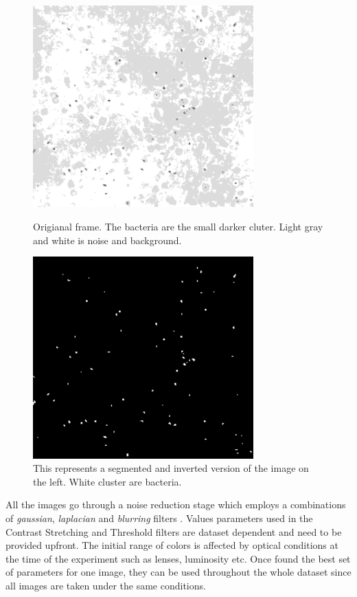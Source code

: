 \documentclass[conference]{IEEEtran}
\begin{document}
\begin{figure}

    \begin{minipage}[l]{1.0\columnwidth}
        \centering
        \includegraphics[width=8.5cm]{./images/bacteriasmall}
        \caption{Origianal frame. The bacteria are the small darker cluter. Light gray and white is noise and background.}\label{contrast}
    \end{minipage}
    \hfill{}
    \begin{minipage}[r]{1.0\columnwidth}
        \centering
        \includegraphics[width=8.5cm]{./images/bacteriasmall_threshold}
        \caption{This represents a segmented and inverted version of the image on the left. White cluster are bacteria.}\label{BBB}
    \end{minipage}
\end{figure}

 
All the images go through a noise reduction stage which employs a combinations of \textit{gaussian}, \textit{laplacian} and \textit{blurring} filters \cite{Deng:1993}.
Values parameters used in the Contrast Stretching and Threshold filters are dataset dependent and need to be provided upfront. The initial range of colors is affected by optical conditions at the time of the experiment such as lenses, luminosity etc. Once found the best set of parameters for one image, they can be used throughout the whole dataset since all images are taken under the same conditions.
\end{document}
